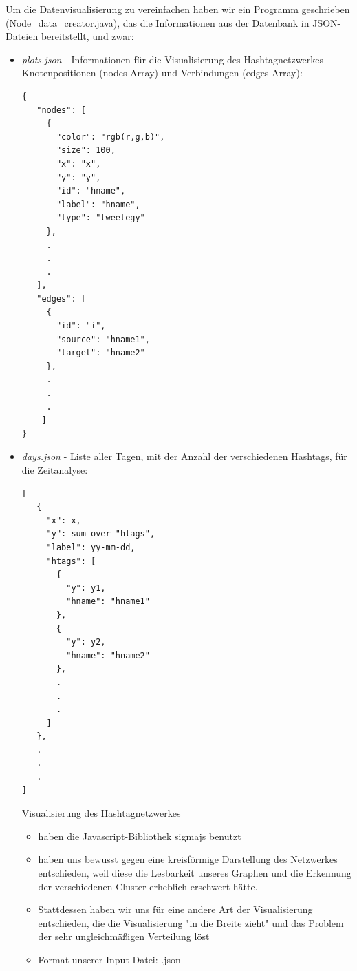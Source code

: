 \documentclass[paper=a4, english, ngerman, romanian]{scrartcl}
\begin{document}
		Um die Datenvisualisierung zu vereinfachen haben wir ein Programm geschrieben (Node\_data\_creator.java), das die Informationen aus der Datenbank in JSON-Dateien bereitstellt, und zwar:
			\begin{itemize}
				\item	\textit{plots.json} - Informationen für die Visualisierung des Hashtagnetzwerkes - Knotenpositionen (nodes-Array) und Verbindungen (edges-Array):
				\begin{lstlisting}
{
   "nodes": [
     {
       "color": "rgb(r,g,b)",
       "size": 100,
       "x": "x",
       "y": "y",
       "id": "hname",
       "label": "hname",
       "type": "tweetegy"
     },
     .
     .
     .
   ],
   "edges": [
     {
       "id": "i",
       "source": "hname1",
       "target": "hname2"
     },
     .
     .
     .
    ]
}
				\end{lstlisting}
				
				\item \textit{days.json} - Liste aller Tagen, mit der Anzahl der verschiedenen Hashtags, für die Zeitanalyse:
				
				\begin{lstlisting}
[
   {
     "x": x,
     "y": sum over "htags",
     "label": yy-mm-dd,
     "htags": [
       {
         "y": y1,
         "hname": "hname1"
       },
       {
         "y": y2,
         "hname": "hname2"
       },
       .
       .
       .
     ]
   },
   .
   .
   .
]
				\end{lstlisting}
\newpage
Visualisierung des Hashtagnetzwerkes 

\begin{itemize}
\item haben die Javascript-Bibliothek sigmajs benutzt
\item haben uns bewusst gegen eine kreisförmige Darstellung des Netzwerkes entschieden, weil diese die Lesbarkeit unseres Graphen und die Erkennung der verschiedenen Cluster erheblich erschwert hätte.
\item Stattdessen haben wir uns für eine andere Art der Visualisierung entschieden, die die Visualisierung "in die Breite zieht" und das Problem der sehr ungleichmäßigen Verteilung löst
\item Format unserer Input-Datei: .json

\end{itemize}


\end{itemize}
\end{document}
